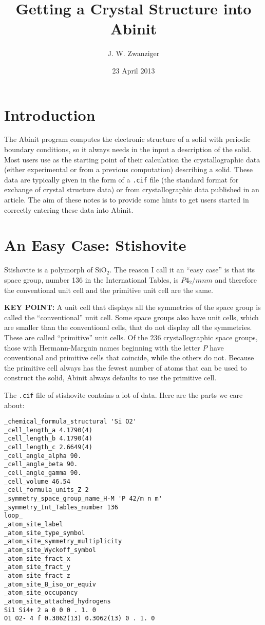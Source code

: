 \documentclass{article}
\author{J. W. Zwanziger}
\date{23 April 2013}
\title{Getting a Crystal Structure into {\sc Abinit}}
\begin{document}
\maketitle

\section{Introduction}

The {\sc Abinit} program computes the electronic structure of a solid with
periodic boundary conditions, so it always needs in the input a description of
the solid. Most users  use as the starting point of their calculation the crystallographic
data (either experimental or from a previous computation) describing a solid. These
data are typically given in the form of a {\tt .cif} file (the standard format for
exchange of crystal structure data) or from crystallographic data published in an
article. The aim of these notes is to provide some hints to get users started in
correctly entering these data into {\sc Abinit}. 

\section{An Easy Case: Stishovite}

Stishovite is a polymorph of SiO$_2$. The reason I call it an ``easy case'' is that its space 
group, number 136 in the International Tables, is $P4_2/mnm$ and therefore the conventional
unit cell and the primitive unit cell are the same.

{\bf KEY POINT:} A unit cell that displays all the symmetries of the space group is called the 
``conventional'' unit cell. Some space groups also have unit cells, which are smaller than 
the conventional cells, that do not display all the symmetries. These are called ``primitive''
unit cells. Of the 236 crystallographic space groups, those with Hermann-Marguin names beginning
with the letter $P$ have conventional and primitive cells that coincide, while the others do not.
Because the primitive cell always has the fewest number of atoms that can be used to construct
the solid, {\sc Abinit} always defaults to use the primitive cell.

The {\tt .cif} file of stishovite contains a lot of data. Here are the parts we care about:
\begin{verbatim}
_chemical_formula_structural 'Si O2'
_cell_length_a 4.1790(4)
_cell_length_b 4.1790(4)
_cell_length_c 2.6649(4)
_cell_angle_alpha 90.
_cell_angle_beta 90.
_cell_angle_gamma 90.
_cell_volume 46.54
_cell_formula_units_Z 2
_symmetry_space_group_name_H-M 'P 42/m n m'
_symmetry_Int_Tables_number 136
loop_
_atom_site_label
_atom_site_type_symbol
_atom_site_symmetry_multiplicity
_atom_site_Wyckoff_symbol
_atom_site_fract_x
_atom_site_fract_y
_atom_site_fract_z
_atom_site_B_iso_or_equiv
_atom_site_occupancy
_atom_site_attached_hydrogens
Si1 Si4+ 2 a 0 0 0 . 1. 0
O1 O2- 4 f 0.3062(13) 0.3062(13) 0 . 1. 0
\end{verbatim}
\end{document}

